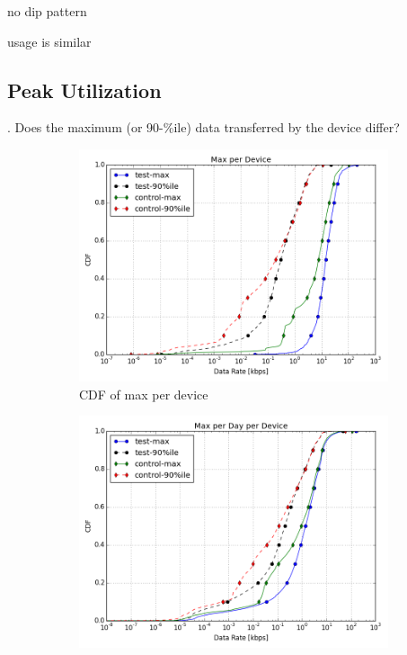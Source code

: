 no dip pattern

usage is similar 


\subsection{Peak Utilization}
\label{subsec:peak-util}

. Does the maximum (or 90-\%ile) data transferred by the device differ?


\begin{figure}[ht!]
\begin{minipage}{0.45\linewidth}
\centering
%
\begin{subfigure}[b]{0.45\linewidth}
\includegraphics[width=\linewidth]{figures/cdf-max-per-device.png}
  \caption{CDF of max per device}
  \label{fig:CDF-data-rate-max}
\end{subfigure}
%
\vspace{-1em}
%
\begin{subfigure}[b]{0.45\linewidth}
\includegraphics[width=\linewidth]{figures/cdf-max-per-day-per-device.png}

\end{subfigure}
\end{minipage}
\end{figure}

